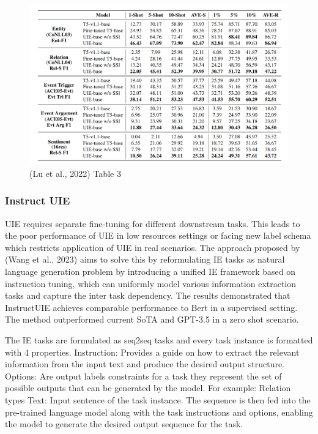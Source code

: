 \documentclass[twocolumn, 11pt]{extarticle}
\begin{document}
\begin{figure}
    \centering
    \includegraphics[width=1\linewidth]{UIE_results.png}
    \caption{(Lu et al., 2022)  Table 3}
    \label{UIE Results}
\end{figure}


\subsubsection{Instruct UIE}
UIE requires separate fine-tuning for different downstream tasks. This leads to the poor performance of UIE in low resources settings or facing new label schema which restricts application of UIE in real scenarios. The approach proposed by (Wang et al., 2023) aims to solve this by reformulating IE tasks as natural language generation problem by introducing a unified IE framework based on instruction tuning, which can uniformly model various information extraction tasks and capture the 	inter task dependency. The results demonstrated that InstructUIE achieves comparable performance to Bert in a supervised setting. The method outperformed current SoTA and GPT-3.5 in a zero shot scenario. 

The IE tasks are formulated as seq2seq tasks and every task instance is formatted with 4 properties. 
Instruction: Provides a guide on how to extract the relevant information from the input text and produce the desired output structure. 
Options: Are output labels constraints for a task they represent the set of possible outputs that can be generated by the model. For example: Relation types
Text: Input sentence of the task instance. 
The sequence is then fed into the pre-trained language model along with the task instructions and options, enabling the model to generate the desired output sequence for the task. 
\end{document}
